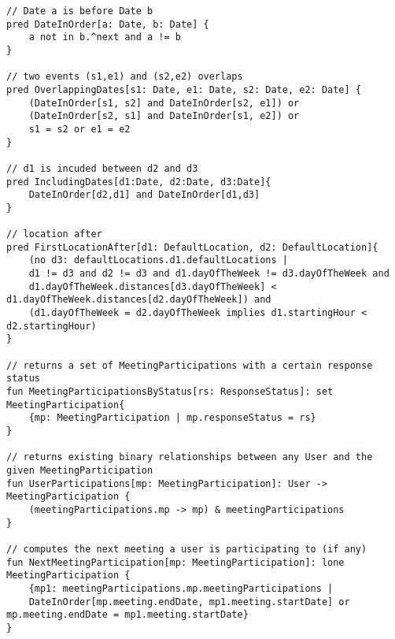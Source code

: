\begin{lstlisting}[style=alloy]
// Date a is before Date b
pred DateInOrder[a: Date, b: Date] {
	a not in b.^next and a != b
}

// two events (s1,e1) and (s2,e2) overlaps
pred OverlappingDates[s1: Date, e1: Date, s2: Date, e2: Date] {
	(DateInOrder[s1, s2] and DateInOrder[s2, e1]) or
	(DateInOrder[s2, s1] and DateInOrder[s1, e2]) or
	s1 = s2 or e1 = e2
}

// d1 is incuded between d2 and d3
pred IncludingDates[d1:Date, d2:Date, d3:Date]{
	DateInOrder[d2,d1] and DateInOrder[d1,d3]
}

// location after
pred FirstLocationAfter[d1: DefaultLocation, d2: DefaultLocation]{
	(no d3: defaultLocations.d1.defaultLocations | 
	d1 != d3 and d2 != d3 and d1.dayOfTheWeek != d3.dayOfTheWeek and 
	d1.dayOfTheWeek.distances[d3.dayOfTheWeek] < d1.dayOfTheWeek.distances[d2.dayOfTheWeek]) and
	(d1.dayOfTheWeek = d2.dayOfTheWeek implies d1.startingHour < d2.startingHour)
}

// returns a set of MeetingParticipations with a certain response status
fun MeetingParticipationsByStatus[rs: ResponseStatus]: set MeetingParticipation{
	{mp: MeetingParticipation | mp.responseStatus = rs}
}

// returns existing binary relationships between any User and the given MeetingParticipation
fun UserParticipations[mp: MeetingParticipation]: User -> MeetingParticipation {
	(meetingParticipations.mp -> mp) & meetingParticipations
}

// computes the next meeting a user is participating to (if any)
fun NextMeetingParticipation[mp: MeetingParticipation]: lone MeetingParticipation {
	{mp1: meetingParticipations.mp.meetingParticipations | 
	DateInOrder[mp.meeting.endDate, mp1.meeting.startDate] or mp.meeting.endDate = mp1.meeting.startDate}
}
\end{lstlisting}
\vspace{0.5cm}